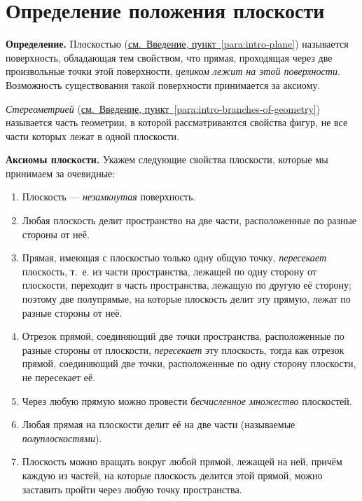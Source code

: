\chapter{Определение положения плоскости}\label{ch:ch1}
\setcounter{kiselevparagraph}{343} %

 \textbf{Определение.} Плоскостью (\hyperref[para:intro-plane]{см.~Введение, пункт~\ref*{para:intro-plane}}) называется поверхность, обладающая тем свойством, что прямая, проходящая через две произвольные точки этой поверхности, \emph{целиком лежит на этой поверхности}. Возможность существования такой поверхности принимается за аксиому.

\emph{Стереометрией} (\hyperref[para:intro-branches-of-geometry]{см.~Введение, пункт~\ref*{para:intro-branches-of-geometry}}) называется часть геометрии, в которой рассматриваются свойства фигур, не все части которых лежат в одной плоскости.

 \textbf{Аксиомы плоскости.} Укажем следующие свойства плоскости, которые мы принимаем за очевидные:

\begin{enumerate}[label=\arabic*),ref=\arabic*]
    \item Плоскость --- \emph{незамкнутая} поверхность.
    \item Любая плоскость делит пространство на две части, расположенные по разные стороны от неё.
    \item\label{item:line-crosses-plane} Прямая, имеющая с плоскостью только одну общую точку, \emph{пересекает} плоскость, т.~е. из части пространства, лежащей по одну сторону от плоскости, переходит в часть пространства, лежащую по другую её сторону; поэтому две полупрямые, на которые плоскость делит эту прямую, лежат по разные стороны от неё.
    \item\label{item:segment-crosses-plane} Отрезок прямой, соединяющий две точки пространства, расположенные по разные стороны от плоскости, \emph{пересекает} эту плоскость, тогда как отрезок прямой, соединяющий две точки, расположенные по одну сторону плоскости, не пересекает её.
    \item Через любую прямую можно провести \emph{бесчисленное множество} плоскостей.
    \item Любая прямая на плоскости делит её на две части (называемые \emph{полуплоскостями}).
    \item Плоскость можно вращать вокруг любой прямой, лежащей на ней, причём каждую из частей, на которые плоскость делится этой прямой, можно заставить пройти через любую точку пространства.
\end{enumerate}

